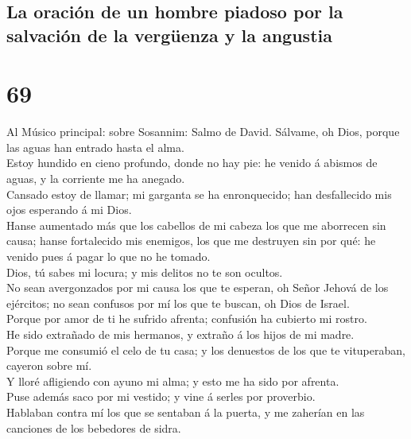 \hypertarget{la-oraciuxf3n-de-un-hombre-piadoso-por-la-salvaciuxf3n-de-la-verguxfcenza-y-la-angustia}{%
\subsection{La oración de un hombre piadoso por la salvación de la
vergüenza y la
angustia}\label{la-oraciuxf3n-de-un-hombre-piadoso-por-la-salvaciuxf3n-de-la-verguxfcenza-y-la-angustia}}

\hypertarget{section-19-69}{%
\section{69}\label{section-19-69}}

 Al Músico principal: sobre Sosannim: Salmo de David.
Sálvame, oh Dios, porque las aguas han entrado hasta el alma.\\
 Estoy hundido en cieno profundo, donde no hay pie: he
venido á abismos de aguas, y la corriente me ha anegado.\\
 Cansado estoy de llamar; mi garganta se ha enronquecido;
han desfallecido mis ojos esperando á mi Dios.\\
 Hanse aumentado más que los cabellos de mi cabeza los que
me aborrecen sin causa; hanse fortalecido mis enemigos, los que me
destruyen sin por qué: he venido pues á pagar lo que no he tomado.\\
 Dios, tú sabes mi locura; y mis delitos no te son
ocultos.\\
 No sean avergonzados por mi causa los que te esperan, oh
Señor Jehová de los ejércitos; no sean confusos por mí los que te
buscan, oh Dios de Israel.\\
 Porque por amor de ti he sufrido afrenta; confusión ha
cubierto mi rostro.\\
 He sido extrañado de mis hermanos, y extraño á los hijos
de mi madre.\\
 Porque me consumió el celo de tu casa; y los denuestos de
los que te vituperaban, cayeron sobre mí.\\
 Y lloré afligiendo con ayuno mi alma; y esto me ha sido
por afrenta.\\
 Puse además saco por mi vestido; y vine á serles por
proverbio.\\
 Hablaban contra mí los que se sentaban á la puerta, y me
zaherían en las canciones de los bebedores de sidra.\\
